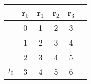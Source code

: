 \begin{figure}
	
	
	\begin{center}
		
		
		\begin{tabular}{ c | c | c | c | c | c } 
			
			& \hspace{.1cm} r$_0$ \hspace{.1cm} &   \hspace{.1cm} r$_1$ \hspace{.1cm} &  \hspace{.1cm} r$_2$ \hspace{.1cm}  &  \hspace{.1cm} r$_3$ \hspace{.1cm} \\[3mm]  
			\hline  
			\hspace{.05cm}&	\Tstrut	\hspace{.1cm} 		0 &     \hspace{.1cm} 1  &        \hspace{.1cm} 2 &  \cellcolor{gray!65}\hspace{.1cm} 3  \\[1mm]
			
			\hspace{.05cm}&		\hspace{.1cm}	    	1 &		  	   \hspace{.1cm} 2  & 	     \cellcolor{gray!65}\hspace{.1cm} 3 &  \cellcolor{gray!45}\hspace{.1cm} 4 \\[1mm]
			
			\hspace{.05cm}&		\hspace{.1cm}	    	2 &	      	   \cellcolor{gray!65}\hspace{.1cm} 3  &   \cellcolor{gray!45}\hspace{.1cm} 4 &  \cellcolor{gray!25}\hspace{.1cm} 5  \\[1mm]
			
			\cellcolor{gray!65}	$l_0$\hspace{.05cm}&\cellcolor{gray!65}	\hspace{.1cm} 3 & \cellcolor{gray!45}\hspace{.1cm} 4  &  \cellcolor{gray!25}\hspace{.1cm} 5 &\cellcolor{gray!10}\hspace{.1cm} 6  \\[1mm]
			

\end{tabular}
\end{center}
\end{figure}

